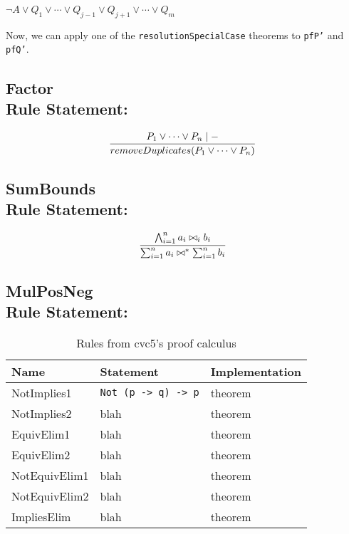 \begin{center}
  $\neg A \vee Q_{1} \vee \cdots \vee Q_{j - 1} \vee Q_{j + 1} \vee \cdots \vee Q_{m}$
\end{center}

Now, we can apply one of the \texttt{resolutionSpecialCase} theorems to \texttt{pfP'} and \texttt{pfQ'}.

\subsection*{Factor\\\normalsize{Rule Statement:}}
\[
  \infer[]{removeDuplicates(P_{1} \vee \cdots \vee P_{n})}{P_{1} \vee \cdots \vee P_{n} \mid -}
\]



\subsection*{SumBounds\\\normalsize{Rule Statement:}}
\[
  \infer[]{\sum_{i = 1}^{n} a_{i} \bowtie^{*} \sum_{i = 1}^{n} b_{i}}{\bigwedge_{i = 1}^{n} a_{i} \bowtie_{i} b_{i}}
\]

\subsection*{MulPosNeg\\\normalsize{Rule Statement:}}





\begin{table}[]\label{tab:rules}
\centering
\begin{tabular}{ l l l }
\toprule
Name        & Statement & Implementation \\ \midrule
NotImplies1 & \texttt{Not (p -> q) -> p}      & theorem        \\ \midrule
NotImplies2 & blah      & theorem        \\ \midrule
EquivElim1  & blah      & theorem        \\ \midrule
EquivElim2  & blah      & theorem        \\ \midrule
NotEquivElim1  & blah      & theorem        \\ \midrule
NotEquivElim2  & blah      & theorem        \\ \midrule
ImpliesElim & blah      & theorem        \\ \bottomrule
\end{tabular}
\caption{Rules from cvc5's proof calculus}
\end{table}



